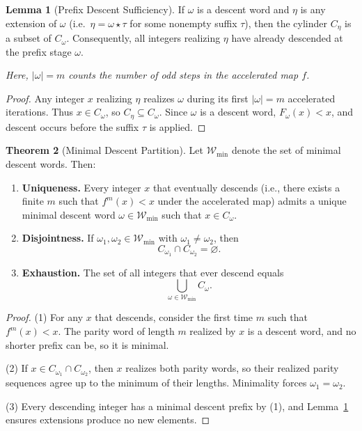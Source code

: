 \documentclass[12pt, oneside]{article}   	%
\numberwithin{equation}{section}          %
\theoremstyle{definition}
\newtheorem{theorem}{Theorem}
\newtheorem{lemma}[theorem]{Lemma}
\begin{document}
\begin{lemma}[Prefix Descent Sufficiency]
\label{lem:prefix-descent}
If $\omega$ is a descent word and $\eta$ is any extension of $\omega$
(i.e.\ $\eta = \omega \star \tau$ for some nonempty suffix $\tau$),
then the cylinder $C_\eta$ is a subset of $C_\omega$.
Consequently, all integers realizing $\eta$ have already descended
at the prefix stage $\omega$.

\emph{Here, $|\omega| = m$ counts the number of odd steps in the accelerated map $f$.}
\end{lemma}

\begin{proof}
Any integer $x$ realizing $\eta$ realizes $\omega$ during its first $|\omega| = m$
accelerated iterations. Thus $x \in C_\omega$, so $C_\eta \subseteq C_\omega$.
Since $\omega$ is a descent word, $F_\omega(x) < x$, and descent occurs
before the suffix $\tau$ is applied.
\end{proof}

\begin{theorem}[Minimal Descent Partition]
\label{thm:minimal-partition}
Let $\mathcal{W}_{\min}$ denote the set of minimal descent words. Then:

\begin{enumerate}
\item \textbf{Uniqueness.}  
Every integer $x$ that eventually descends (i.e., there exists a finite $m$ such
that $f^m(x)<x$ under the accelerated map) admits a unique minimal descent word
$\omega \in \mathcal{W}_{\min}$ such that $x \in C_\omega$.

\item \textbf{Disjointness.}  
If $\omega_1, \omega_2 \in \mathcal{W}_{\min}$ with $\omega_1 \neq \omega_2$, then
\[
C_{\omega_1} \cap C_{\omega_2} = \varnothing.
\]

\item \textbf{Exhaustion.}  
The set of all integers that ever descend equals
\[
\bigcup_{\omega \in \mathcal{W}_{\min}} C_\omega.
\]
\end{enumerate}
\end{theorem}

\begin{proof}
(1) For any $x$ that descends, consider the first time $m$ such that $f^m(x)<x$.
The parity word of length $m$ realized by $x$ is a descent word, and no
shorter prefix can be, so it is minimal.

(2) If $x \in C_{\omega_1} \cap C_{\omega_2}$, then $x$ realizes both parity
words, so their realized parity sequences agree up to the minimum of their lengths.
Minimality forces $\omega_1 = \omega_2$.

(3) Every descending integer has a minimal descent prefix by (1), and
Lemma~\ref{lem:prefix-descent} ensures extensions produce no new elements.
\end{proof}
\end{document}
